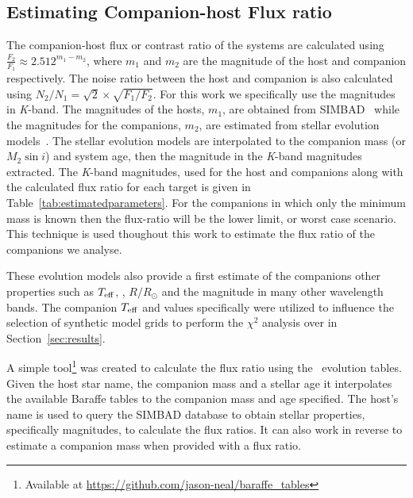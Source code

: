 \subsection{Estimating Companion-host Flux ratio}
\label{compaion flux ration}
The companion-host flux or contrast ratio of the systems are calculated using \( \frac{F_{2}}{F_{1}} \approx 2.512^{m_{1}-m_{2}} \), where \(m_{1} \) and \(m_{2} \) are the magnitude of the host and companion respectively. The noise ratio between the host and companion is also calculated using \(N_{2}/N_{1} = \sqrt{2} \times\sqrt{F_{1}/F_{2}}\).  For this work we specifically use the magnitudes in \textit{K}-band. The magnitudes of the hosts, \(m_{1} \), are obtained from SIMBAD~\citep{wenger_simbad_2000} while the magnitudes for the companions, \(m_{2} \), are estimated from stellar evolution models~\citet{baraffe_evolutionary_2003, baraffe_new_2015}. The stellar evolution models are interpolated to the companion mass (or \(M_{2}\sin{i}\)) and system age, then the magnitude in the \textit{K}-band magnitudes extracted. The \textit{K}-band magnitudes, used for the host and companions along with the calculated flux ratio for each target is given in Table~\ref{tab:estimatedparameters}. For the companions in which only the minimum mass is known then the flux-ratio will be the lower limit, or worst case scenario. This technique is used thoughout this work to estimate the flux ratio of the companions we analyse.

These evolution models also provide a first estimate of the companions other properties such as \(T_{\mathrm{eff}}{}\), \logg{}, \(R/R_{\odot}\) and the magnitude in many other wavelength bands. The companion \(T_{\mathrm{eff}}{}\) and \logg{} values specifically were utilized to influence the selection of synthetic model grids to perform the \(\chi^2\) analysis over in Section~\ref{sec:results}.

A simple tool\footnote{Available at \url{https://github.com/jason-neal/baraffe_tables}} was created to calculate the flux ratio using the~\citep{baraffe_evolutionary_2003,baraffe_new_2015} evolution tables. Given the host star name, the companion mass and a stellar age it interpolates the available Baraffe tables to the companion mass and age specified. The host's name is used to query the {SIMBAD} database to obtain stellar properties, specifically magnitudes, to calculate the flux ratios. It can also work in reverse to estimate a companion mass when provided with a flux ratio.


